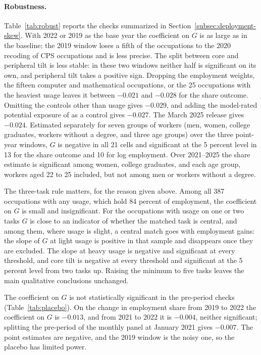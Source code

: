 \documentclass[12pt]{article}
\theoremstyle{plain}
\theoremstyle{definition}
\theoremstyle{remark}
\begin{document}
\paragraph{Robustness.}
Table~\ref{tab:robust} reports the checks summarized in
Section~\ref{subsec:deployment-skew}. With 2022 or 2019 as the base year
the coefficient on $G$ is as large as in the baseline; the 2019 window
loses a fifth of the occupations to the 2020 recoding of CPS occupations
and is less precise. The split between core and peripheral tilt is less
stable: in these two windows neither half is significant on its own, and
peripheral tilt takes a positive sign. Dropping the employment weights, the fifteen computer
and mathematical occupations, or the 25 occupations with the heaviest
usage leaves it between $-0.021$ and $-0.028$ for the share outcome.
Omitting the controls other than usage gives $-0.029$, and adding the
model-rated potential exposure of \citet{EloundouEtAl2024} as a control
gives $-0.027$. The March 2025 release gives $-0.024$. Estimated
separately for seven groups of workers (men, women, college graduates,
workers without a degree, and three age groups) over the three point-year
windows, $G$ is negative in all 21 cells and significant at the 5 percent
level in 13 for the share outcome and 10 for log employment. Over
2021--2025 the share estimate is significant among women, college
graduates, and each age group, workers aged 22 to 25 included, but not
among men or workers without a degree.

The three-task rule matters, for the reason given above. Among all 387
occupations with any usage, which hold 84 percent of employment, the
coefficient on $G$ is small and insignificant. For the occupations with
usage on one or two tasks $G$ is close to an indicator of whether the
matched task is central, and among them, where usage is slight, a central
match goes with employment gains: the slope of $G$ at light usage is
positive in that sample and disappears once they are excluded. The slope
at heavy usage is negative and significant at every threshold, and core
tilt is negative at every threshold and significant at the 5 percent
level from two tasks up. Raising the minimum to five tasks leaves the main qualitative
conclusions unchanged.

The coefficient on $G$ is not statistically significant in the
pre-period checks
(Table~\ref{tab:placebo}). On the change in employment
share from 2019 to 2022 the coefficient on $G$ is $-0.013$, and from
2021 to 2022 it is $-0.004$, neither significant; splitting the
pre-period of the monthly panel at January 2021 gives $-0.007$. The
point estimates are negative, and the 2019 window is the noisy one, so
the placebo has limited power.
\end{document}
